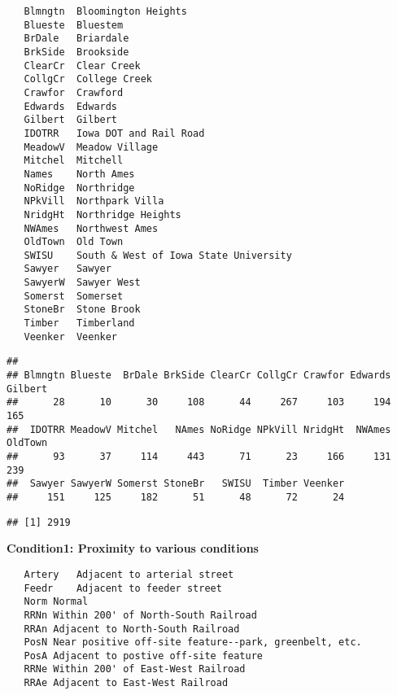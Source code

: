 \documentclass[]{article}
\newenvironment{Shaded}{\begin{snugshade}}{\end{snugshade}}
\newcommand{\CommentTok}[1]{\textcolor[rgb]{0.56,0.35,0.01}{\textit{#1}}}
\newcommand{\KeywordTok}[1]{\textcolor[rgb]{0.13,0.29,0.53}{\textbf{#1}}}
\newcommand{\NormalTok}[1]{#1}
\newcommand{\OperatorTok}[1]{\textcolor[rgb]{0.81,0.36,0.00}{\textbf{#1}}}
\newcommand{\StringTok}[1]{\textcolor[rgb]{0.31,0.60,0.02}{#1}}
\begin{document}
\begin{verbatim}
   Blmngtn  Bloomington Heights
   Blueste  Bluestem
   BrDale   Briardale
   BrkSide  Brookside
   ClearCr  Clear Creek
   CollgCr  College Creek
   Crawfor  Crawford
   Edwards  Edwards
   Gilbert  Gilbert
   IDOTRR   Iowa DOT and Rail Road
   MeadowV  Meadow Village
   Mitchel  Mitchell
   Names    North Ames
   NoRidge  Northridge
   NPkVill  Northpark Villa
   NridgHt  Northridge Heights
   NWAmes   Northwest Ames
   OldTown  Old Town
   SWISU    South & West of Iowa State University
   Sawyer   Sawyer
   SawyerW  Sawyer West
   Somerst  Somerset
   StoneBr  Stone Brook
   Timber   Timberland
   Veenker  Veenker
\end{verbatim}

\begin{Shaded}
\end{Shaded}

\begin{verbatim}
## 
## Blmngtn Blueste  BrDale BrkSide ClearCr CollgCr Crawfor Edwards Gilbert 
##      28      10      30     108      44     267     103     194     165 
##  IDOTRR MeadowV Mitchel   NAmes NoRidge NPkVill NridgHt  NWAmes OldTown 
##      93      37     114     443      71      23     166     131     239 
##  Sawyer SawyerW Somerst StoneBr   SWISU  Timber Veenker 
##     151     125     182      51      48      72      24
\end{verbatim}

\begin{Shaded}
\end{Shaded}

\begin{verbatim}
## [1] 2919
\end{verbatim}

\textbf{Condition1: Proximity to various conditions}

\begin{verbatim}
   Artery   Adjacent to arterial street
   Feedr    Adjacent to feeder street   
   Norm Normal  
   RRNn Within 200' of North-South Railroad
   RRAn Adjacent to North-South Railroad
   PosN Near positive off-site feature--park, greenbelt, etc.
   PosA Adjacent to postive off-site feature
   RRNe Within 200' of East-West Railroad
   RRAe Adjacent to East-West Railroad
\end{verbatim}
\end{document}
